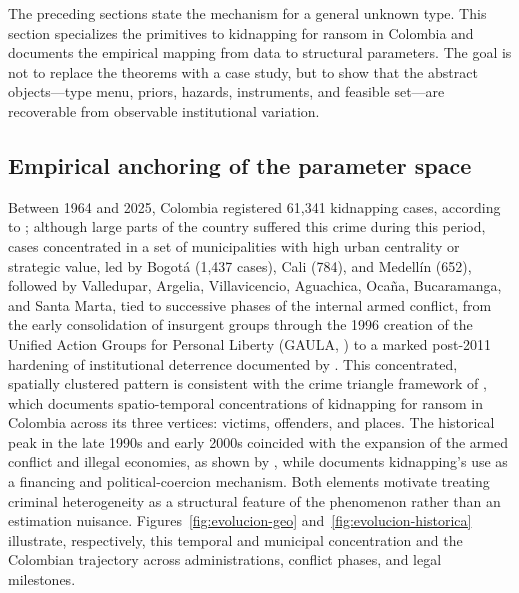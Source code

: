 \documentclass[review,authoryear,12pt]{elsarticle}
\theoremstyle{plain}
\theoremstyle{definition}
\newcommand{\1}{\mathbf{1}}
\begin{document}
The preceding sections state the mechanism for a general unknown type. This section specializes the primitives to kidnapping for ransom in Colombia and documents the empirical mapping from data to structural parameters. The goal is not to replace the theorems with a case study, but to show that the abstract objects---type menu, priors, hazards, instruments, and feasible set---are recoverable from observable institutional variation.

\subsection{Empirical anchoring of the parameter space}\label{sec:institutional}

Between 1964 and 2025, Colombia registered 61,341 kidnapping cases, according to \citet{cnmh_datos}; although large parts of the country suffered this crime during this period, cases concentrated in a set of municipalities with high urban centrality or strategic value, led by Bogotá (1,437 cases), Cali (784), and Medellín (652), followed by Valledupar, Argelia, Villavicencio, Aguachica, Ocaña, Bucaramanga, and Santa Marta, tied to successive phases of the internal armed conflict, from the early consolidation of insurgent groups through the 1996 creation of the Unified Action Groups for Personal Liberty (GAULA, \citealt{ley282_1996}) to a marked post-2011 hardening of institutional deterrence documented by \citet{CNMH2013}. This concentrated, spatially clustered pattern is consistent with the crime triangle framework of \citet{Pires2014}, which documents spatio-temporal concentrations of kidnapping for ransom in Colombia across its three vertices: victims, offenders, and places. The historical peak in the late 1990s and early 2000s coincided with the expansion of the armed conflict and illegal economies, as shown by \citet{pinto2004}, while \citet{Zarate2007} documents kidnapping's use as a financing and political-coercion mechanism. Both elements motivate treating criminal heterogeneity as a structural feature of the phenomenon rather than an estimation nuisance. Figures~\ref{fig:evolucion-geo} and~\ref{fig:evolucion-historica} illustrate, respectively, this temporal and municipal concentration and the Colombian trajectory across administrations, conflict phases, and legal milestones.
\end{document}
